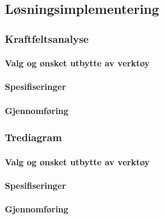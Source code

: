 \subsection{Løsningsimplementering}

\subsubsection{Kraftfeltsanalyse}

\paragraph{Valg og ønsket utbytte av verktøy}


\paragraph{Spesifiseringer}


\paragraph{Gjennomføring}



\subsubsection{Trediagram}

\paragraph{Valg og ønsket utbytte av verktøy}


\paragraph{Spesifiseringer}


\paragraph{Gjennomføring}

